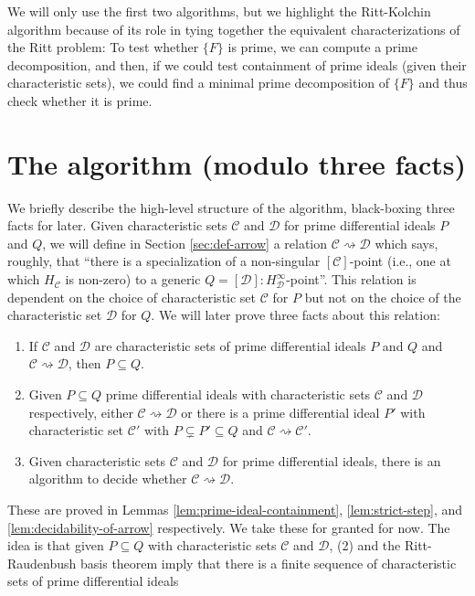 \documentclass[12pt]{amsart}
\theoremstyle{definition}
\numberwithin{subcase}{cases}
\theoremstyle{remark}
\newcommand{\mc}[1]{\mathcal{#1}}
\begin{document}
We will only use the first two algorithms, but we highlight the Ritt-Kolchin algorithm because of its role in tying together the equivalent characterizations of the Ritt problem: To test whether $\{F\}$ is prime, we can compute a prime decomposition, and then, if we could test containment of prime ideals (given their characteristic sets), we could find a minimal prime decomposition of $\{F\}$ and thus check whether it is prime.


\section{The algorithm (modulo three facts)}\label{sec:algorithm}

We briefly describe the high-level structure of the algorithm, black-boxing three facts for later. Given characteristic sets $\mc{C}$ and $\mc{D}$ for prime differential ideals $P$ and $Q$, we will define in Section \ref{sec:def-arrow} a relation $\mc{C} \rightsquigarrow \mc{D}$ which says, roughly, that ``there is a specialization of a non-singular $[\mc{C}]$-point (i.e., one at which $H_{\mc{C}}$ is non-zero) to a generic $Q = [\mc{D}]:H_{\mc{D}}^\infty$-point''.  This relation is dependent on the choice of characteristic set $\mc{C}$ for $P$ but not on the choice of the characteristic set $\mc{D}$ for $Q$. We will later prove three facts about this relation:
\begin{enumerate}
    \item If $\mc{C}$ and $\mc{D}$ are characteristic sets of prime differential ideals $P$ and $Q$ and $\mc{C} \rightsquigarrow \mc{D}$, then $P \subseteq Q$.
    \item Given $P \subseteq Q$ prime differential ideals with characteristic sets $\mc{C}$ and $\mc{D}$ respectively, either $\mc{C} \rightsquigarrow \mc{D}$ or there is a prime differential ideal $P'$ with characteristic set $\mc{C}'$ with $P \subsetneq P' \subseteq Q$ and $\mc{C} \rightsquigarrow \mc{C}'$.
    \item Given characteristic sets $\mc{C}$ and $\mc{D}$ for prime differential ideals, there is an algorithm to decide whether $\mc{C} \rightsquigarrow \mc{D}$.
\end{enumerate}
These are proved in Lemmas \ref{lem:prime-ideal-containment}, \ref{lem:strict-step}, and \ref{lem:decidability-of-arrow} respectively. We take these for granted for now. The idea is that given $P \subseteq Q$ with characteristic sets $\mc{C}$ and $\mc{D}$, (2) and the Ritt-Raudenbush basis theorem imply that there is a finite sequence of characteristic sets of prime differential ideals
\end{document}
